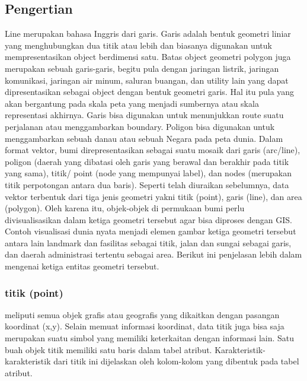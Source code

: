 \subsection{Pengertian}
  Line merupakan bahasa Inggris dari garis. Garis adalah bentuk geometri liniar yang
 menghubungkan dua titik atau lebih dan biasanya digunakan untuk mempresentasikan
 object berdimensi satu. Batas object geometri polygon juga merupakan sebuah garis-garis,
 begitu pula dengan jaringan listrik, jaringan komunikasi, jaringan air minum, saluran buangan,
 dan utility lain yang dapat dipresentasikan sebagai object dengan bentuk geometri garis.
 Hal itu pula yang akan bergantung pada skala peta yang menjadi sumbernya atau skala
 representasi akhirnya.
  Garis bisa digunakan untuk menunjukkan route suatu perjalanan atau menggambarkan boundary. 
 Poligon bisa digunakan untuk menggambarkan sebuah danau atau sebuah Negara pada peta dunia. 
 Dalam format vektor, bumi direpresentasikan sebagai suatu mosaik dari garis (arc/line), 
 poligon (daerah yang dibatasi oleh garis yang berawal dan berakhir pada titik yang sama), 
 titik/ point (node yang mempunyai label), dan nodes (merupakan titik perpotongan antara dua baris).
  Seperti telah diuraikan sebelumnya, data vektor terbentuk dari tiga jenis geometri yakni 
 titik (point), garis (line), dan area (polygon). 
 Oleh karena itu, objek-objek di permukaan bumi perlu divisualisasikan 
 dalam ketiga geometri tersebut agar bisa diproses dengan GIS. 
 Contoh visualisasi dunia nyata menjadi elemen gambar ketiga geometri tersebut antara lain landmark dan fasilitas sebagai titik, 
 jalan dan sungai sebagai garis, dan daerah administrasi tertentu sebagai area. 
 Berikut ini penjelasan lebih dalam mengenai ketiga entitas geometri tersebut.
 
 \subsubsection{titik (point)}
  meliputi semua objek grafis atau geografis yang dikaitkan dengan pasangan koordinat (x,y). 
  Selain memuat informasi koordinat, data  titik juga bisa saja merupakan suatu simbol yang memiliki 
  keterkaitan dengan informasi lain.  Satu buah objek titik memiliki satu baris dalam tabel atribut. 
  Karakteristik-karakteristik dari titik ini dijelaskan oleh kolom-kolom yang dibentuk pada tabel atribut.
  
